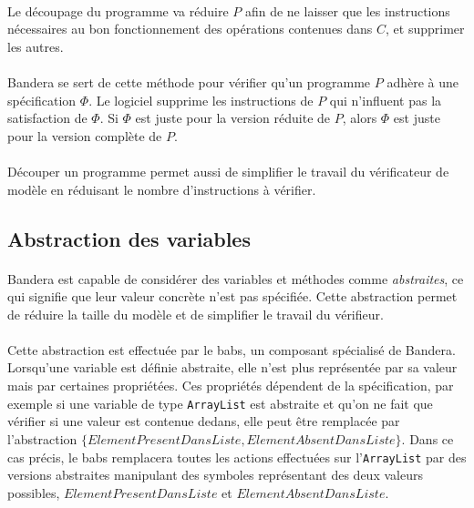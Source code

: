 \paragraph{}
Le découpage du programme va réduire $P$ afin de ne laisser que les
instructions nécessaires au bon fonctionnement des opérations
contenues dans $C$, et supprimer les autres.

\paragraph{}
Bandera se sert de cette méthode pour vérifier qu'un programme $P$
adhère à une spécification $\Phi$. Le logiciel supprime les
instructions de $P$ qui n'influent pas la satisfaction de $\Phi$. Si
$\Phi$ est juste pour la version réduite de $P$, alors $\Phi$ est
juste pour la version complète de $P$.

\paragraph{}
Découper un programme permet aussi de simplifier le travail du
vérificateur de modèle en réduisant le nombre d'instructions à
vérifier.

\subsection{Abstraction des variables}
\label{sec:bandera_abstraction}

\paragraph{}
Bandera est capable de considérer des variables et méthodes comme
\textit{abstraites}, ce qui signifie que leur valeur concrète n'est
pas spécifiée. Cette abstraction permet de réduire la taille du modèle
et de simplifier le travail du vérifieur.

\paragraph{}
Cette abstraction est effectuée par le \gls{babs}, un composant
spécialisé de Bandera. Lorsqu'une variable est définie abstraite, elle
n'est plus représentée par sa valeur mais par certaines
propriétées. Ces propriétés dépendent de la spécification, par exemple
si une variable de type \verb|ArrayList| est abstraite et qu'on ne
fait que vérifier si une valeur est contenue dedans, elle peut être
remplacée par l'abstraction
$\{ ElementPresentDansListe, ElementAbsentDansListe \}$. Dans ce cas
précis, le \gls{babs} remplacera toutes les actions effectuées sur
l'\verb|ArrayList| par des versions abstraites manipulant des symboles
représentant des deux valeurs possibles, $ElementPresentDansListe$ et
$ElementAbsentDansListe$.

